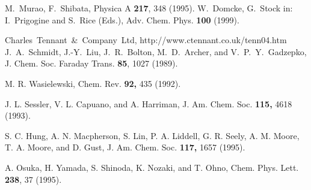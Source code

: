 \documentclass[12pt,twoside,a4paper]{report}
\begin{document}
{\begin{thebibliography}{999}
 M.~Murao, F.~Shibata, Physica A {\bf 217}, 348 (1995).
 W.~Domcke, G.~Stock in: I.~Prigogine and S.~Rice (Eds.),  Adv. Chem. Phys.  {\bf 100}  (1999).



 \mbox{Charles Tennant \& Company 
    Ltd}, http://www.ctennant.co.uk/tenn04.htm 
  J.~A.~Schmidt, J.-Y.~Liu, J.~R.~Bolton, M.~D.~Archer, and
  V.~P.~Y.~Gadzepko, J. Chem. Soc. Faraday Trans. {\bf 85}, 1027 (1989).















  M. R. Wasielewski, Chem. Rev. \textbf{92,} 435 (1992). 
 
  J. L. Sessler, V. L. Capuano, and A. Harriman, J. Am. 
Chem. Soc. \textbf{115,} 4618 (1993). 
 
  S. C. Hung, A. N. Macpherson, S. Lin, P. A. Liddell, G. 
R. Seely, A. M. Moore, T. A. Moore, and D. Gust, J. Am. Chem. Soc. \textbf{%
117,} 1657 (1995). 
 
  A. Osuka, H. Yamada, S. Shinoda, K. Nozaki, and T. Ohno, 
Chem. Phys. Lett. \textbf{238}, 37 (1995). 
 

\end{thebibliography}}
\end{document}
